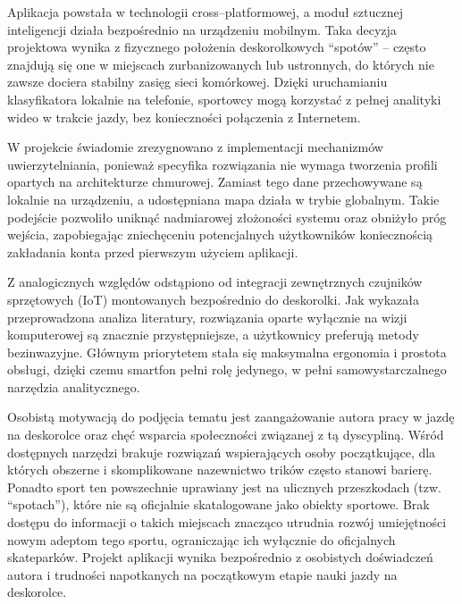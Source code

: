         Aplikacja powstała w technologii cross–platformowej, a moduł sztucznej inteligencji działa bezpośrednio na urządzeniu mobilnym. Taka decyzja projektowa wynika z fizycznego położenia deskorolkowych \enquote{spotów} – często znajdują się one w miejscach zurbanizowanych lub ustronnych, do których nie zawsze dociera stabilny zasięg sieci komórkowej. Dzięki uruchamianiu klasyfikatora lokalnie na telefonie, sportowcy mogą korzystać z pełnej analityki wideo w trakcie jazdy, bez konieczności połączenia z Internetem.
        
        W projekcie świadomie zrezygnowano z implementacji mechanizmów uwierzytelniania, ponieważ specyfika rozwiązania nie wymaga tworzenia profili opartych na architekturze chmurowej. Zamiast tego dane przechowywane są lokalnie na urządzeniu, a udostępniana mapa działa w trybie globalnym. Takie podejście pozwoliło uniknąć nadmiarowej złożoności systemu oraz obniżyło próg wejścia, zapobiegając zniechęceniu potencjalnych użytkowników koniecznością zakładania konta przed pierwszym użyciem aplikacji. 

        Z analogicznych względów odstąpiono od integracji zewnętrznych czujników sprzętowych (IoT) montowanych bezpośrednio do deskorolki. Jak wykazała przeprowadzona analiza literatury, rozwiązania oparte wyłącznie na wizji komputerowej są znacznie przystępniejsze, a użytkownicy preferują metody bezinwazyjne. Głównym priorytetem stała się maksymalna ergonomia i prostota obsługi, dzięki czemu smartfon pełni rolę jedynego, w pełni samowystarczalnego narzędzia analitycznego.

        Osobistą motywacją do podjęcia tematu jest zaangażowanie autora pracy w jazdę na deskorolce oraz chęć wsparcia społeczności związanej z tą dyscypliną. Wśród dostępnych narzędzi brakuje rozwiązań wspierających osoby początkujące, dla których obszerne i skomplikowane nazewnictwo trików często stanowi barierę. Ponadto sport ten powszechnie uprawiany jest na ulicznych przeszkodach (tzw. \enquote{spotach}), które nie są oficjalnie skatalogowane jako obiekty sportowe. Brak dostępu do informacji o takich miejscach znacząco utrudnia rozwój umiejętności nowym adeptom tego sportu, ograniczając ich wyłącznie do oficjalnych skateparków. Projekt aplikacji wynika bezpośrednio z osobistych doświadczeń autora i trudności napotkanych na początkowym etapie nauki jazdy na deskorolce.

